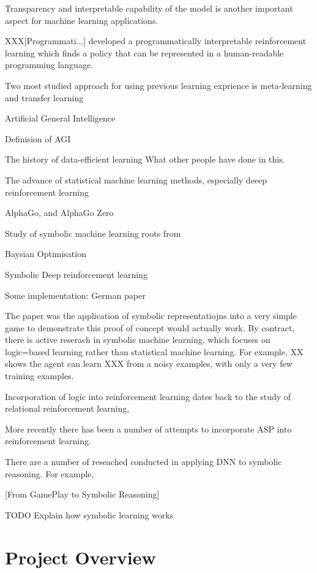 \documentclass[12pt,twoside]{report}
\begin{document}
Transparency and interpretable capability of the model is another important aspect for machine learning applications.

XXX[Programmati...] developed a programmatically interpretable reinforcement learning which finds a policy that can be represented in a human-readable programming language.

Two most studied approach for using previous learning exprience is meta-learning and transfer learning

Artificial General Intelligence

Definision of AGI

The history of data-efficient learning
What other people have done in this.

The advance of statistical machine learning methods, especially deeep reinforcement learning

AlphaGo, and AlphaGo Zero

Study of symbolic machine learning roots from

Baysian Optimisation

Symbolic Deep reinforcement learning

Some implementation: German paper

The paper was the application of symbolic representatiojns into a very simple game to demonstrate this proof of concept would actually work.
By contract, there is active reserach in symbolic machine learning, which focuses on logic=based learning rather than statistical machine learning.
For example, XX shows the agent can learn XXX from a noisy examples, with only a very few training examples.


Incorporation of logic into reinforcement learning dates back to the study of relational reinforcement learning,


More recently there has been a number of attempts to incorporate ASP into reinforcement learning.

There are a number of reseached conducted in applying DNN to symbolic reasoning.
For example,

[From GamePlay to Symbolic Reasoning]


TODO Explain how symbolic learning works


\chapter{Project Overview}
\label{project_overview}
\end{document}
